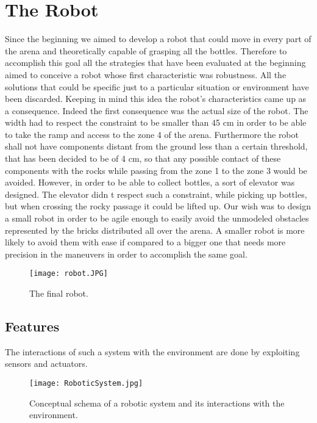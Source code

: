 %
%   
%

\chapter{The Robot}
Since the beginning we aimed to develop a robot that could move in every part of the arena and theoretically capable of grasping all the bottles.
Therefore to accomplish this goal all the strategies that have been evaluated at the beginning aimed to conceive a robot whose first characteristic was robustness. All the solutions that could be specific just to a particular situation or environment have been discarded.
Keeping in mind this idea the robot’s characteristics came up as a consequence.
Indeed the first consequence was the actual size of the robot. The width had to respect the constraint to be smaller than 45 cm in order to be able to take the ramp and access to the zone 4 of the arena.
Furthermore the robot shall not have components distant from the ground less than a certain threshold, that has been decided to be of 4 cm, so that any possible contact of these components with the rocks while passing from the zone 1 to the zone 3 would be avoided.
However, in order to be able to collect bottles, a sort of elevator was designed. The elevator didn\textsc{} t respect such a constraint, while picking up bottles, but when crossing the rocky passage it could be lifted up.
Our wish was to design a small robot in order to be agile enough to easily avoid the unmodeled  obstacles represented by the bricks distributed all over the arena.
A smaller robot is more likely to avoid them with ease if compared to a bigger one that needs more precision in the maneuvers in order to accomplish the same goal.


\begin{figure}[H]
 \centering
 \texttt{[image: robot.JPG]}
 \caption{The final robot.}
\label{fig:robot}
\end{figure}

\section{Features}
The interactions of such a system with the environment are done by exploiting sensors and actuators. 
\begin{figure}[H]
\centering
\texttt{[image: RoboticSystem.jpg]}
\caption{Conceptual schema of a robotic system and its interactions with the environment.}
\label{fig:RoboticSystem}
\end{figure}

